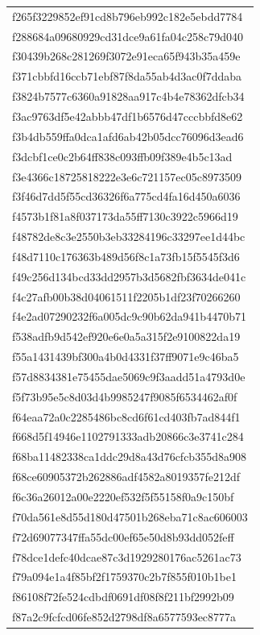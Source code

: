 \begin{tabular}{l}
f265f3229852ef91cd8b796eb992c182e5ebdd7784 \\
f288684a09680929cd31dce9a61fa04c258c79d040 \\
f30439b268c281269f3072e91eca65f943b35a459e \\
f371cbbfd16ccb71ebf87f8da55ab4d3ac0f7ddaba \\
f3824b7577c6360a91828aa917c4b4e78362dfcb34 \\
f3ac9763df5e42abbb47df1b6576d47cccbbfd8e62 \\
f3b4db559ffa0dca1afd6ab42b05dcc76096d3ead6 \\
f3dcbf1ce0c2b64ff838c093ffb09f389e4b5c13ad \\
f3e4366c18725818222e3e6c721157ec05c8973509 \\
f3f46d7dd5f55cd36326f6a775cd4fa16d450a6036 \\
f4573b1f81a8f037173da55ff7130c3922c5966d19 \\
f48782de8c3e2550b3eb33284196c33297ee1d44bc \\
f48d7110c176363b489d56f8c1a73fb15f5545f3d6 \\
f49c256d134bcd33dd2957b3d5682fbf3634de041c \\
f4c27afb00b38d04061511f2205b1df23f70266260 \\
f4e2ad07290232f6a005dc9c90b62da941b4470b71 \\
f538adfb9d542ef920e6e0a5a315f2e9100822da19 \\
f55a1431439bf300a4b0d4331f37ff9071e9c46ba5 \\
f57d8834381e75455dae5069c9f3aadd51a4793d0e \\
f5f73b95e5c8d03d4b9985247f9085f6534462af0f \\
f64eaa72a0c2285486bc8cd6f61cd403fb7ad844f1 \\
f668d5f14946e1102791333adb20866c3e3741c284 \\
f68ba11482338ca1ddc29d8a43d76cfcb355d8a908 \\
f68ce60905372b262886adf4582a8019357fe212df \\
f6c36a26012a00e2220ef532f5f55158f0a9c150bf \\
f70da561e8d55d180d47501b268eba71c8ac606003 \\
f72d69077347ffa55dc00ef65e50d8b93dd052feff \\
f78dce1defc40dcae87c3d1929280176ac5261ac73 \\
f79a094e1a4f85bf2f1759370c2b7f855f010b1be1 \\
f86108f72fe524cdbdf0691df08f8f211bf2992b09 \\
f87a2c9fcfcd06fe852d2798df8a6577593ec8777a \\

\end{tabular}
